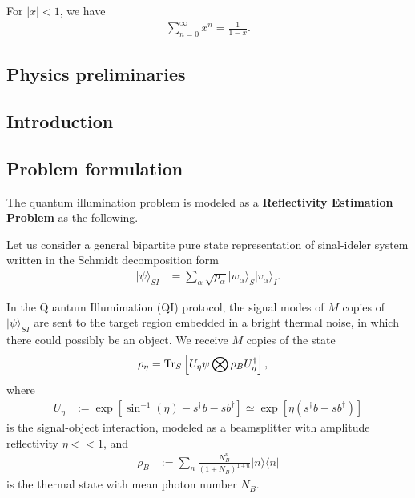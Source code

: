 \documentclass[../../note.tex]{subfiles}
\begin{document}
\begin{lemma}
    For $\vert x \vert < 1$, we have
    \begin{align}
        \sum_{n=0}^{\infty} x^n = \frac{1}{1 - x}.
    \end{align}
\end{lemma}

\begin{lemma}
    
\end{lemma}


\subsection{Physics preliminaries}


\subsection{Introduction}


\subsection{Problem formulation}
The quantum illumination problem is modeled as a \textbf{Reflectivity Estimation Problem} as the following.

Let us consider a general bipartite pure state representation of sinal-ideler system written in the Schmidt decomposition form
\begin{align}
    \vert \psi \rangle_{SI}
    &= \sum_{\alpha} \sqrt{p_{\alpha}} \vert w_{\alpha} \rangle_S \vert v_{\alpha} \rangle_I.
\end{align}

In the Quantum Illumimation (QI) protocol, the signal modes of $M$ copies of $\vert \psi \rangle_{SI}$ are sent to the target region embedded in a bright thermal noise, in which there could possibly be an object. We receive $M$ copies of the state
\begin{align}
    \rho_{\eta}
    &= \operatorname{Tr}_S\left[U_{\eta} \psi \bigotimes \rho_B U_{\eta}^{\dagger}\right],
\end{align}
where 
\begin{align}
    U_{\eta}
    &:= \exp[\sin^{-1}(\eta) - s^\dagger b - s b^\dagger] \simeq \exp[\eta(s^\dagger b - s b^\dagger)]
\end{align}
is the signal-object interaction, modeled as a beamsplitter with amplitude reflectivity $\eta << 1$, and 
\begin{align}
    \rho_B
    &:= \sum_n \frac{N_B^n}{(1+N_B)^{1+n}} \vert n \rangle \langle n \vert
\end{align} 
is the thermal state with mean photon number $N_B$.
\end{document}
